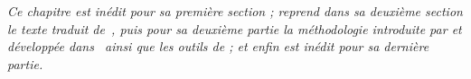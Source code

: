 \stars


\textit{Ce chapitre est inédit pour sa première section ; reprend dans sa deuxième section le texte traduit de~\cite{raimbault2015models}, puis pour sa deuxième partie la méthodologie introduite par \cite{raimbault2016indirect} et développée dans~\cite{raimbault2017exploration} ainsi que les outils de \cite{bergeaud2017classifying} ; et enfin est inédit pour sa dernière partie.}





